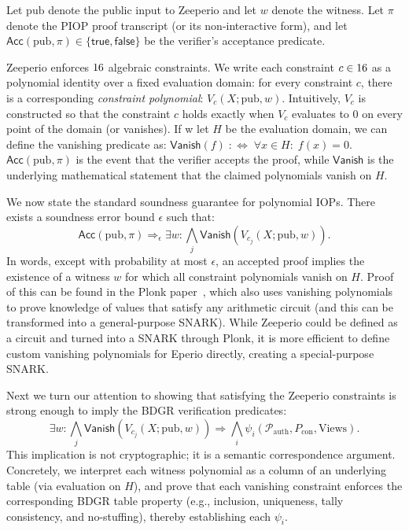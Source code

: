 Let $\mathrm{pub}$ denote the public input to Zeeperio and let $w$ denote the witness. Let $\pi$ denote the PIOP proof transcript (or its non-interactive form), and let $\mathsf{Acc}(\mathrm{pub},\pi)\in\{\mathsf{true},\mathsf{false}\}$ be the verifier’s acceptance predicate.

Zeeperio enforces $16$ algebraic constraints. We write each constraint $c\in16$ as a polynomial identity over a fixed evaluation domain: for every constraint $c$, there is a corresponding \emph{constraint polynomial}: $V_{c}(X;\mathrm{pub},w)$. Intuitively, $V_c$ is constructed so that the constraint $c$ holds exactly when $V_c$ evaluates to $0$ on every point of the domain (or vanishes). If w let $H$ be the evaluation domain, we can define the vanishing predicate as: $\mathsf{Vanish}(f)\;:\Leftrightarrow\;\forall x\in H:\; f(x)=0$. $\mathsf{Acc}(\mathrm{pub},\pi)$ is the event that the verifier accepts the proof, while $\mathsf{Vanish}$ is the underlying mathematical statement that the claimed polynomials vanish on $H$.

We now state the standard soundness guarantee for polynomial IOPs. There exists a soundness error bound $\epsilon$ such that:
\[
\mathsf{Acc}(\mathrm{pub},\pi)\Rightarrow_{\epsilon}\exists w:\bigwedge_j \mathsf{Vanish}\!\left(V_{c_j}(X;\mathrm{pub},w)\right).
\]
In words, except with probability at most $\epsilon$, an accepted proof implies the existence of a witness $w$ for which all constraint polynomials vanish on $H$. Proof of this can be found in the Plonk paper~\cite{GWC19}, which also uses vanishing polynomials to prove knowledge of values that satisfy any arithmetic circuit (and this can be transformed into a general-purpose SNARK). While Zeeperio could be defined as a circuit and turned into a SNARK through Plonk, it is more efficient to define custom vanishing polynomials for Eperio directly, creating a special-purpose SNARK.

Next we turn our attention to showing that satisfying the Zeeperio constraints is strong enough to imply the BDGR verification predicates:
\[
\exists w:\bigwedge_j \mathsf{Vanish}\!\left(V_{c_j}(X;\mathrm{pub},w)\right)\Rightarrow \bigwedge_i \psi_i(\mathcal{P}_{\mathrm{auth}},P_{\mathrm{con}},\mathrm{Views}).
\]
This implication is not cryptographic; it is a semantic correspondence argument. Concretely, we interpret each witness polynomial as a column of an underlying table (via evaluation on $H$), and prove that each vanishing constraint enforces the corresponding BDGR table property (e.g., inclusion, uniqueness, tally consistency, and no-stuffing), thereby establishing each $\psi_i$.

